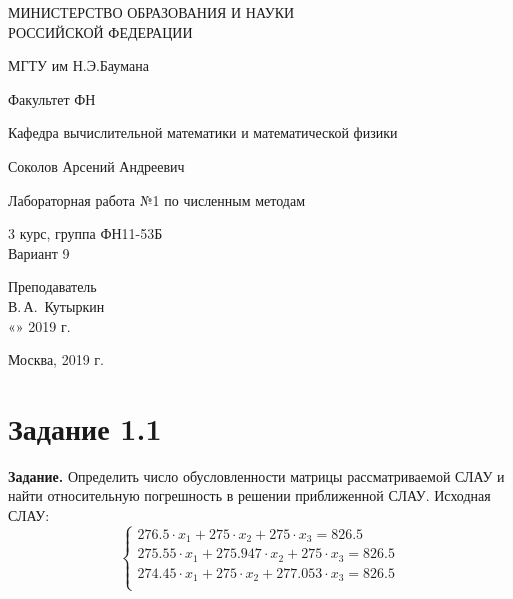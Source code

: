 \documentclass[14pt,a4paper]{scrartcl}
\begin{document}
	\begin{titlepage}
	\begin{center}
		\large
		МИНИСТЕРСТВО ОБРАЗОВАНИЯ И НАУКИ\\ РОССИЙСКОЙ ФЕДЕРАЦИИ
		
		\vspace{0.5cm}
		
		МГТУ им Н.Э.Баумана
		\vspace{0.25cm}
		
		Факультет ФН
		
		Кафедра вычислительной математики и математической физики
		\vfill
		
		
		Соколов Арсений Андреевич\\
		\vfill
		
		
		{\LARGE Лабораторная работа №1 по численным методам\\[2mm]
		}
		\bigskip
		
		3 курс, группа ФН11-53Б\\
		Вариант 9
	\end{center}
	\vfill
	
	\newlength{\ML}
	\hfill\begin{minipage}{0.4\textwidth}
		Преподаватель\\
		\underline{\hspace{3cm}} В.\,А.~Кутыркин\\
		«\underline{\hspace{0.7cm}}» \underline{\hspace{1.71cm}} 2019 г.
	\end{minipage}%
	\bigskip
	
	
	\vfill
	
	\begin{center}
		Москва, 2019 г.
	\end{center}
\end{titlepage}

\section*{Задание 1.1}
\textbf{Задание.} Определить число обусловленности матрицы рассматриваемой СЛАУ и найти относительную погрешность в решении приближенной СЛАУ.
Исходная СЛАУ:
\[
	\begin{cases}
	276.5 \cdot x_1      +  275 \cdot x_2      +  275 \cdot x_3   =   826.5 \\ 
	275.55 \cdot x_1  +  275.947 \cdot x_2      +  275 \cdot x_3   =   826.5 \\ 
	274.45 \cdot x_1      +  275 \cdot x_2  +  277.053 \cdot x_3   =   826.5 \\ 
	\end{cases}
\]
\end{document}
